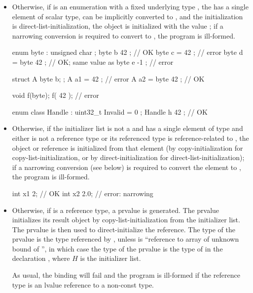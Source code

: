 \begin{itemize}
\item Otherwise, if  is an enumeration
with a fixed underlying type ,
the  has a single element  of scalar type,
 can be implicitly converted to , and
the initialization is direct-list-initialization,
the object is initialized with the value ;
if a narrowing conversion is required to convert 
to , the program is ill-formed.
\begin{example}
\begin{codeblock}
enum byte : unsigned char { };
byte b { 42 };                      // OK
byte c = { 42 };                    // error
byte d = byte{ 42 };                // OK; same value as 
byte e { -1 };                      // error

struct A { byte b; };
A a1 = { { 42 } };                  // error
A a2 = { byte{ 42 } };              // OK

void f(byte);
f({ 42 });                          // error

enum class Handle : uint32_t { Invalid = 0 };
Handle h { 42 };                    // OK
\end{codeblock}
\end{example}

\item Otherwise, if
the initializer list
is not a  and
has a single element of type  and either
 is not a reference type or its referenced type is
reference-related to , the object or reference is initialized
from that element (by copy-initialization for copy-list-initialization,
or by direct-initialization for direct-list-initialization);
if a narrowing conversion (see below) is required
to convert the element to , the program is ill-formed.

\begin{example}
\begin{codeblock}
int x1 {2};                         // OK
int x2 {2.0};                       // error: narrowing
\end{codeblock}
\end{example}

\item Otherwise, if  is a reference type, a prvalue is generated.
The prvalue initializes its result object by copy-list-initialization from the initializer list.
The prvalue is then used to direct-initialize the reference.
The type of the prvalue is the type referenced by ,
unless  is ``reference to array of unknown bound of '',
in which case the type of the prvalue is
the type of  in the declaration ,
where $H$ is the initializer list.
\begin{note}
As usual, the binding will fail and the program is ill-formed if
the reference type is an lvalue reference to a non-const type.
\end{note}


\end{itemize}
